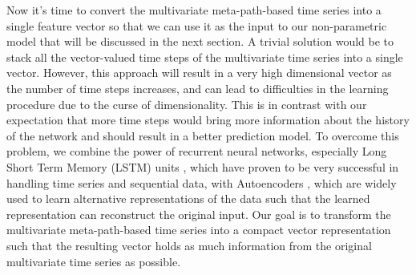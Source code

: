 Now it's time to convert the multivariate meta-path-based time series into a single feature vector so that we can use it as the input to our non-parametric model that will be discussed in the next section. A trivial solution would be to stack all the vector-valued time steps of the multivariate time series into a single vector. However, this approach will result in a very high dimensional vector as the number of time steps increases, and can lead to difficulties in the learning procedure due to the curse of dimensionality. This is in contrast with our expectation that more time steps would bring more information about the history of the network and should result in a better prediction model. To overcome this problem, we combine the power of recurrent neural networks, especially Long Short Term Memory (LSTM) units \cite{hochreiter1997long}, which have proven to be very successful in handling time series and sequential data, with Autoencoders \cite{bengio2009learning}, which are widely used to learn alternative representations of the data such that the learned representation can reconstruct the original input. {\color{red}Our goal is to transform the multivariate meta-path-based time series into a compact vector representation such that the resulting vector holds as much information from the original multivariate time series as possible.}

